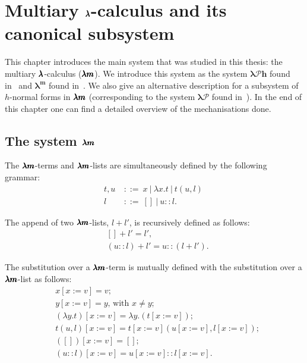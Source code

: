 \chapter{Multiary $\pmb{\lambda}$-calculus and its canonical subsystem}
\label{c:multiary}

This chapter introduces the main system that was studied in this thesis: the multiary $\pmb{\lambda}$-calculus ($\pmb{\lambda m}$).
We introduce this system as the system $\pmb{\lambda \mathcal{P}h}$ found in~\cite[Chapter~3]{JCES2002} and $\pmb{\lambda^m}$ found in~\cite{JCESLuis}.
We also give an alternative description for a subsystem of $h$-normal forms in $\pmb{\lambda m}$ (corresponding to the system $\pmb{\lambda \mathcal{P}}$ found in~\cite[Chapter~3]{JCES2002}).
In the end of this chapter one can find a detailed overview of the mechanisations done.

\section{The system $\pmb{\lambda m}$}

\begin{definition}
  The $\pmb{\lambda m}$-terms and $\pmb{\lambda m}$-lists are simultaneously defined by the following grammar:  
  \begin{align*} 
    t, u \ &::= \ x \ | \ \lambda x . t \ | \ t(u, l) \ \\
    l      &::= \ []\  | \ u :: l.
  \end{align*}
\end{definition}

\begin{definition}[Append]
  The append of two $\pmb{\lambda m}$-lists, $l + l'$, is recursively defined as follows:
  \begin{align*}
  & [] + l' = l', \\
  & (u::l) + l' = u::(l + l').
  \end{align*}
\end{definition}

\begin{definition}
  The substitution over a $\pmb{\lambda m}$-term is mutually defined with the substitution over a $\pmb{\lambda m}$-list as follows:  
  \begin{align*}
  & x[x := v] = v ; \\
  & y[x := v] = y \text{, with } x \neq y ; \\
  & (\lambda y . t)[x := v] = \lambda y . (t[x := v]) ; \\
  & t(u, l)[x := v] = t[x := v](u[x := v], l[x := v]) ; \\    
  & ([])[x := v] = [] ; \\ 
  & (u::l)[x := v] = u[x := v] :: l[x := v] .
  \end{align*}
\end{definition}

